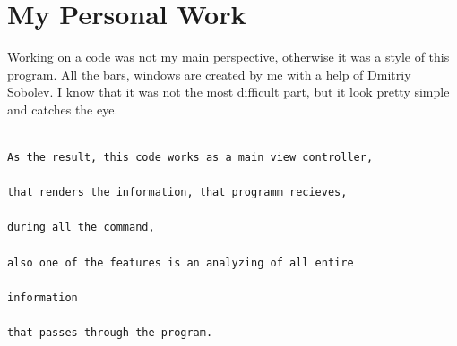 \documentclass{tufte-handout}
\begin{document}
\section{My Personal Work}
Working on a code was not my main perspective, otherwise it was a style of this program. All the bars, windows are created by me with a help of Dmitriy Sobolev. I know that it was not the most difficult part, but it look pretty simple and catches the eye.





\begin{shaded}
\begin{verbatim}

As the result, this code works as a main view controller, 

that renders the information, that programm recieves,

during all the command, 

also one of the features is an analyzing of all entire 

information 

that passes through the program.

\end{verbatim}
\end{shaded}



\vspace{1cm}
\end{document}
